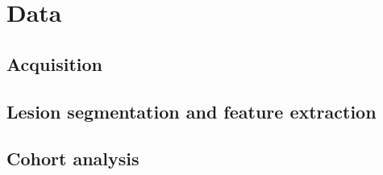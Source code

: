 \chapter{Data}

\section{Acquisition}

\section{Lesion segmentation and feature extraction}

\section{Cohort analysis}

